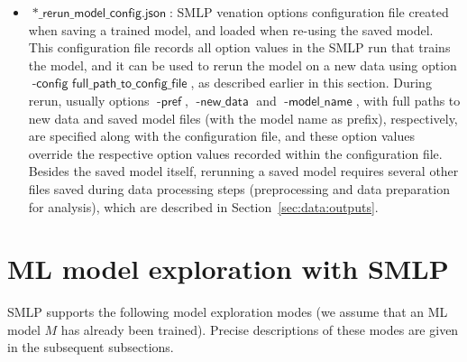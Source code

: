 \documentclass[a4paper,parskip=half]{article} %
\newcommand*\option[1]{\operatorname{\mathsf{#1}}} %
\newcommand*\suffix[1]{\operatorname{\mathsf{#1}}} %
\begin{document}
\begin{itemize}
\item $\suffix{*\_rerun\_model\_config.json}$: SMLP venation options configuration file created when saving 
a trained model, and loaded when re-using the saved model. This configuration file records all option values in the 
SMLP run that trains the model, and it can be used to rerun the model on a new data using option 
$\option{-config\,\,full\_path\_to\_config\_file}$, as described earlier in this section. During rerun, usually
options $\option{-pref}$, $\option{-new\_data}$ and $\option{-model\_name}$, with full paths to new data 
and saved model files (with the model name as prefix), respectively, are specified along with the configuration file, 
and these option values override the respective option values recorded within the configuration file.
Besides the saved model itself, rerunning a saved model requires several other files saved during data processing
steps (preprocessing and data preparation for analysis), which are described in Section~\ref{sec:data:outputs}.  
\end{itemize}


\section{ML model exploration with SMLP}\label{sec:exploration}

SMLP supports the following model exploration modes (we assume that an ML model $M$ has already been trained). 
Precise descriptions of these modes are given in the subsequent subsections.
\end{document}
